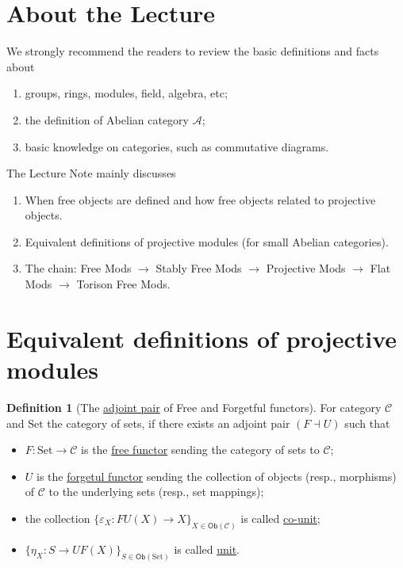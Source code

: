 \documentclass{MainStyle}
\theoremstyle{definition}
\theoremstyle{definition}
\theoremstyle{definition}
\newtheorem{definition}{Definition}
\theoremstyle{definition}
\theoremstyle{definition}
\theoremstyle{definition}
\theoremstyle{definition}
\theoremstyle{remark}
\theoremstyle{remark}
\begin{document}
\maketitle
\section{About the Lecture}
We strongly recommend the readers to review the basic definitions and facts about
\begin{enumerate}
    \item groups, rings, modules, field, algebra, etc;
    \item the definition of Abelian category $\mathcal A$;
    \item basic knowledge on categories, such as commutative diagrams.
\end{enumerate}
The Lecture Note mainly discusses
\begin{enumerate}
    \item When free objects are defined and how free objects related to projective objects.
    \item Equivalent definitions of projective modules (for small Abelian categories).
    \item The chain: Free Mods $\to$ Stably Free Mods $\to$ Projective Mods $\to$ Flat Mods $\to$ Torison Free Mods.
\end{enumerate}

\section{Equivalent definitions of projective modules}

\begin{definition}[The \href{https://ncatlab.org/nlab/show/adjoint+functor}{adjoint pair} of Free and Forgetful functors]
    For category $\mathcal C$ and $\mathrm{Set}$ the category of sets, if there exists an adjoint pair $(F\dashv U)$ such that
    \begin{itemize}
        \item $F:\mathrm{Set}\to \mathcal C$ is the \href{https://ncatlab.org/nlab/show/free+functor}{free functor} sending the category of sets to $\mathcal C$;
        \item $U$ is the \href{https://ncatlab.org/nlab/show/forgetful+functor}{forgetul functor} sending the collection of objects (resp., morphisms) of $\mathcal C$ to the underlying sets (resp., set mappings);
        \item the collection $\{\varepsilon_X:FU(X)\to X\}_{X\in \mathsf{Ob}(\mathcal C)}$ is called \href{https://ncatlab.org/nlab/show/unit+of+an+adjunction}{co-unit};
        \item $\{\eta_X:S\to UF(X)\}_{S\in\mathsf{Ob}(\mathrm{Set})}$ is called \href{https://ncatlab.org/nlab/show/unit+of+an+adjunction}{unit}.
    \end{itemize}
\end{definition}
\end{document}
